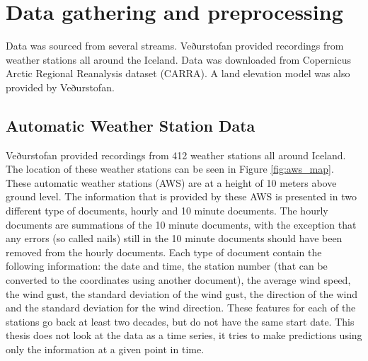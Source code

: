 
\chapter{Data gathering and preprocessing} %

\label{Chapter2} %


Data was sourced from several streams. Veðurstofan provided recordings from weather stations all around the Iceland. Data was downloaded from Copernicus Arctic Regional Reanalysis dataset (CARRA). A land elevation model was also provided by Veðurstofan.

\section{Automatic Weather Station Data}

Veðurstofan provided recordings from 412 weather stations all around Iceland. The location of these weather stations can be seen in Figure \ref{fig:aws_map}. These automatic weather stations (AWS) are at a height of 10 meters above ground level. The information that is provided by these AWS is presented in two different type of documents, hourly and 10 minute documents. The hourly documents are summations of the 10 minute documents, with the exception that any errors (so called nails) still in the 10 minute documents should have been removed from the hourly documents. Each type of document contain the following information: the date and time, the station number (that can be converted to the coordinates using another document), the average wind speed, the wind gust, the standard deviation of the wind gust, the direction of the wind and the standard deviation for the wind direction. These features for each of the stations go back at least two decades, but do not have the same start date. This thesis does not look at the data as a time series, it tries to make predictions using only the information at a given point in time.

